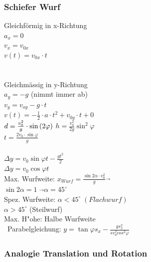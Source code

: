 	\subsubsection{Schiefer Wurf}
\begin{multicols}{3}
	Gleichförmig in x-Richtung \\
	$a_{x} = 0$ \\
	$v_{x} = v_{0x}$ \\
	$v(t)= v_{0x} \cdot t $\\
	\\
\columnbreak
	\\
	Gleichmässig in y-Richtung \\
	$a_{y} = -g$ (nimmt immer ab)\\
	$v_{y} = v_{oy} - g \cdot t$ \\
	$v(t) = -\frac{1}{2} \cdot a \cdot t^2 + v_{0y} \cdot t + 0$ \\
	$d = \frac{v_{0}^2}{g} \cdot \sin{(2\varphi)} \\$
	$h = \frac{v_{0}^2}{2g}\sin^2{\varphi}$ \\
	$t = \frac{2v_{0} \cdot \sin{\varphi}}{g}$ \\
\columnbreak
\\
	$\Delta y = v_{0}\sin{\varphi}t - \frac{gt^2}{2}$ \\
	$\Delta y = v_{0}\cos{\varphi}t$ \\
	Max. Wurfweite: $x_{Wurf} = \frac{\sin2\alpha \cdot v_{0}^2}{g} \overrightarrow{}$ \\ $\sin2\alpha = 1 \; \overrightarrow{} \alpha = 45^\circ$ \\
	Spez. Wurfweite: $\alpha < 45^\circ \; (Flachwurf)$ \\
	$ \alpha > 45^\circ$ \; (Steilwurf)\\
	Max. H"ohe: Halbe Wurfweite \\
\	Parabelgleichung: $y = \tan{\varphi}s_{x} - \frac{gs_{x}^2}{sv_{0}^2cos^2{\varphi}}$ \\
\end{multicols}
					
\subsubsection{Analogie Translation und Rotation}
